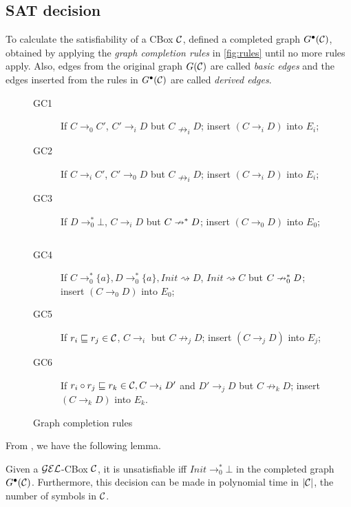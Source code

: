 \subsection{SAT decision}

To calculate the satisfiability of a CBox $\mathcal{C}$, \citet{Fin2020} defined a completed graph $G^\bullet(\mathcal{C})$, obtained by applying the \emph{graph completion rules} in \autoref{fig:rules} until no more rules apply. Also, edges from the original graph $G(\mathcal{C})$ are called \emph{basic edges} and the edges inserted from the rules in $G^\bullet(\mathcal{C})$ are called \emph{derived edges}. 

\begin{figure}[h]
	\centering
	\begin{minipage}{0.45\textwidth}
		\begin{description}
			\item[GC1] If $C \to_0 C'$, $C' \to_i D$ but $C \nrightarrow_i D$; insert $(C \to_i D)$ into $E_i$;
			\item[GC2] If $C \to_i C'$, $C' \to_0 D$ but $C \nrightarrow_i D$; insert $(C \to_i D)$ into $E_i$;
			\item[GC3] If $D \to_0^* \bot$, $C \to_i D$ but $C \nrightarrow^* D$; insert $(C \to_0 D)$ into $E_0$;
		\end{description}  \end{minipage}
	$\quad$
	\begin{minipage}{0.45\textwidth}
		\begin{description}
			\item[GC4] If $C \to_0^* \{a\}, D \to_0^* \{a\}, Init \rightsquigarrow D$, $Init \rightsquigarrow C$ but $C \nrightarrow_0^* D$; insert $(C \to_0 D)$ into $E_0$;
			\item[GC5] If $r_i \sqsubseteq r_j \in \mathcal{C}$, $C \to_i$ but $C \not\to_j D$; insert $(C \to_j D)$ into $E_j$;
			\item[GC6] If $r_i \circ r_j \sqsubseteq r_k \in \mathcal{C}, C \to_i D'$ and $D' \to_j D$ but $C \not\to_k D$; insert $(C \to_k D)$ into $E_k$.
		\end{description}  \end{minipage}
	\caption{Graph completion rules}
	\label{fig:rules}
\end{figure}

From \citet{Fin2020}, we have the following lemma.

\begin{lemma}
\label{lemma-comp-sat}
Given a $\mathcal{GEL}$-CBox $\mathcal{C}$, it is unsatisfiable iff $Init \to_0^* \bot$ in the completed graph $G^\bullet(\mathcal{C})$. Furthermore, this decision can be made in polynomial time in $|\mathcal{C}|$, the number of symbols in $\mathcal{C}$.
\end{lemma}

